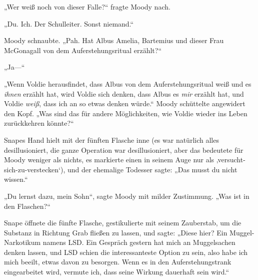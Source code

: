 „Wer weiß noch von dieser Falle?“ fragte Moody nach.

„Du. Ich. Der Schulleiter. Sonst niemand.“

Moody schnaubte. „Pah. Hat Albus Amelia, Bartemius und dieser Frau McGonagall von dem Auferstehungsritual erzählt?“

„Ja—“

„Wenn Voldie herausfindet, dass Albus von dem Auferstehungsritual weiß und es \emph{ihnen} erzählt hat, wird Voldie sich denken, dass Albus es \emph{mir} erzählt hat, und Voldie \emph{weiß}, dass ich an so etwas denken würde.“ Moody schüttelte angewidert den Kopf. „Was sind das für andere Möglichkeiten, wie Voldie wieder ins Leben zurückkehren könnte?“

Snapes Hand hielt mit der fünften Flasche inne (es war natürlich alles desillusioniert, die ganze Operation war desillusioniert, aber das bedeutete für Moody weniger als nichts, es markierte einen in seinem Auge nur als ‚versucht-sich-zu-verstecken‘), und der ehemalige Todesser sagte: „Das musst du nicht wissen.“

„Du lernst dazu, mein Sohn“, sagte Moody mit milder Zustimmung. „Was ist in den Flaschen?“

Snape öffnete die fünfte Flasche, gestikulierte mit seinem Zauberstab, um die Substanz in Richtung Grab fließen zu lassen, und sagte: „Diese hier? Ein Muggel-Narkotikum namens LSD. Ein Gespräch gestern hat mich an Muggelsachen denken lassen, und LSD schien die interessanteste Option zu sein, also habe ich mich beeilt, etwas davon zu besorgen. Wenn es in den Auferstehungstrank eingearbeitet wird, vermute ich, dass seine Wirkung dauerhaft sein wird.“

